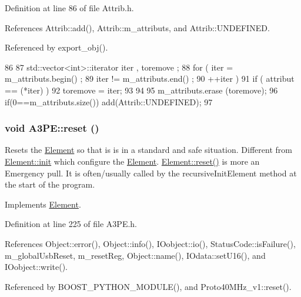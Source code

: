 Definition at line 86 of file Attrib.h.

References Attrib::add(), Attrib::m\_\-attributs, and Attrib::UNDEFINED.

Referenced by export\_\-obj().


\begin{DoxyCode}
86                                {
87     std::vector<int>::iterator iter , toremove ;
88     for ( iter  = m_attributs.begin() ;
89           iter != m_attributs.end()   ;
90           ++iter ) {
91       if ( attribut == (*iter) ) {
92         toremove = iter;
93       }
94     }
95     m_attributs.erase (toremove);
96     if(0==m_attributs.size()) add(Attrib::UNDEFINED);
97   }
\end{DoxyCode}
\hypertarget{classA3PE_a449775588222d544aeeaab190d553652}{
\subsubsection[{reset}]{\setlength{\rightskip}{0pt plus 5cm}void A3PE::reset ()}}
\label{classA3PE_a449775588222d544aeeaab190d553652}
Resets the \hyperlink{classElement}{Element} so that is is in a standard and safe situation. Different from \hyperlink{classElement_af42754b5cabc198869222725218d695c}{Element::init} which configure the \hyperlink{classElement}{Element}. \hyperlink{classElement_a69efffa22f06909d768149715565cb56}{Element::reset()} is more an Emergency pull. It is often/usually called by the recursiveInitElement method at the start of the program. 

Implements \hyperlink{classElement_a69efffa22f06909d768149715565cb56}{Element}.

Definition at line 225 of file A3PE.h.

References Object::error(), Object::info(), IOobject::io(), StatusCode::isFailure(), m\_\-globalUsbReset, m\_\-resetReg, Object::name(), IOdata::setU16(), and IOobject::write().

Referenced by BOOST\_\-PYTHON\_\-MODULE(), and Proto40MHz\_\-v1::reset().


